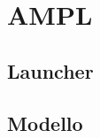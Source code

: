 \documentclass[main.tex]{subfiles}
\begin{document}
\section{AMPL}

\subsection{Launcher}


\subsection{Modello}

\end{document}
